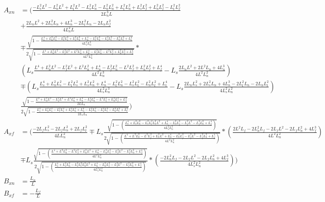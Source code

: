 \documentclass[11pt, landscape]{article}
\begin{document}
\begin{align}
  A_{xn} &= \Bigg(\frac{-L_s^2L^2 - L_n^2L^2 + L_t^2L^2 - L_s^2L_{n}^2 - L_n^2L_{n}^2 + L_t^2L_{n}^2 + L_s^2L_{f}^2 + L_n^2L_{f}^2 - L_t^2L_{f}^2}{{2L_n^{3}L}}\\
  &+ \frac{2L_nL^2 + 2L_s^2L_{n} + 4L_n^3 - 2L_t^2L_{n} - 2L_nL_{f}^2}{4L_n^2L}\\
  &\mp \frac{\sqrt{1-\frac{L_{s}^4 + L_n^2L_{s}^2 - L_t^2L_{s}^2 + L_s^2L_{n}^2 + L_{n}^4 - L_t^2L_{n}^2 - L_s^2L_{t}^2 - L_n^2L_{t}^2 + L_{t}^4}{4L_{s}^2L_{n}^2}}}{2\sqrt{1-\frac{L^4 + L_n^2L^2 - L_f^2L^2 + L^2L_{n}^2 + L_{n}^4 - L_f^2L_{n}^2 - L^2L_{f}^2 + L_n^2L_{f}^2 + L_{f}^4}{4L^2L_{n}^2}}}*\\
  &\left(L_s\frac{L^4 + L_n^2L^2 - L_f^2L^2 + L^2L_{n}^2 + L_{n}^4 - L_f^2L_{n}^2 - L^2L_{f}^2 + L_n^2L_{f}^2 + L_{f}^4}{4L^2L^3_{n}} - L_s\frac{2L_nL^2 + 2L^2L_{n} + 4L_{n}^3}{4L^2L_{n}^2}\right)\\
  &\mp \left(L_s\frac{L_{s}^4 + L_n^2L_{s}^2 - L_t^2L_{s}^2 + L_s^2L_{n}^2 + L_{n}^4 - L_t^2L_{n}^2 - L_s^2L_{t}^2 - L_n^2L_{t}^2 + L_{t}^4}{4L_{s}^2L^3_{n}}
    - L_s\frac{2L_nL_{s}^2 + 2L_s^2L_{n} + 4L_{n}^3 - 2L_t^2L_{n} - 2L_nL_{t}^2}{4L_{s}^2L_{n}^2}\right)\\
    &\frac{\sqrt{1-\frac{L^4 + L_n^2L^2 - L_f^2L^2 + L^2L_{n}^2 + L_{n}^4 - L_f^2L_{n}^2 - L^2L_{f}^2 + L_n^2L_{f}^2 + L_{f}^4}{2LL_{n}}}}{2\sqrt{1-\frac{L_{s}^4 + L_n^2L_{s}^2 - L_t^2L_{s}^2 + L_s^2L_{n}^2 + L_{n}^4 - L_t^2L_{n}^2 - L_s^2L_{t}^2 - L_n^2L_{t}^2 + L_{t}^4}{2L_{s}L_{n}}}}\Bigg)\\
  A_{xf} &= \Bigg(\frac{-2L_fL_s^2 - 2L_fL_n^2 + 2L_fL_t^2}{4LL_{n}^2}
  \mp L_s\frac{\sqrt{1-\left(\frac{L_s^4 + L_s^2L_n^2 - L_s^2L_t^2 L_n^2L^2 + L_n^4 - L_n^2L_f^2 - L_f^2L^2 - L_f^2L_n^2 + L_f^4}{4L_{s}^2L_{n}^2}\right)}}{2\sqrt{1 - \left(\frac{L^4 + L^2L_n^2 - L^2L_f^2 + L_n^2L^2 + L_n^4 - L_n^2L_f^2 - L_f^2L^2 - L_f^2L_n^2 + L_f^4}{4L^2L_{n}^2}\right)}}
  *\left(\frac{2L^2L_f - 2L_n^2L_f - 2L_fL^2 - 2L_fL_n^2 + 4L_f^3}{4L^2L_{n}^2}\right)\\
  &\mp L_s\frac{\sqrt{1 - \left(\frac{L^4 + L^2L_n^2 - L^2L_f^2 + L_n^2L^2 + L_n^4 - L_n^2L_f^2 - L_f^2L^2 - L_f^2L_n^2 + L_f^4}{4L^2L_{n}^2}\right)}}{2\sqrt{1-\left(\frac{L_s^4 + L_s^2L_n^2 - L_s^2L_t^2 L_n^2L^2 + L_n^4 - L_n^2L_f^2 - L_f^2L^2 - L_f^2L_n^2 + L_f^4}{4L_{s}^2L_{n}^2}\right)}}
  *\left(\frac{-2L_n^2L_f - 2L_fL^2 - 2L_fL_n^2 + 4L_f^3}{4L_{s}^2L_{n}^2}\right)\Bigg)\\
  B_{xn} &= \frac{L_n}{L}\\
  B_{xf} &= - \frac{L_f}{L}\\
\end{align}
\end{document}
